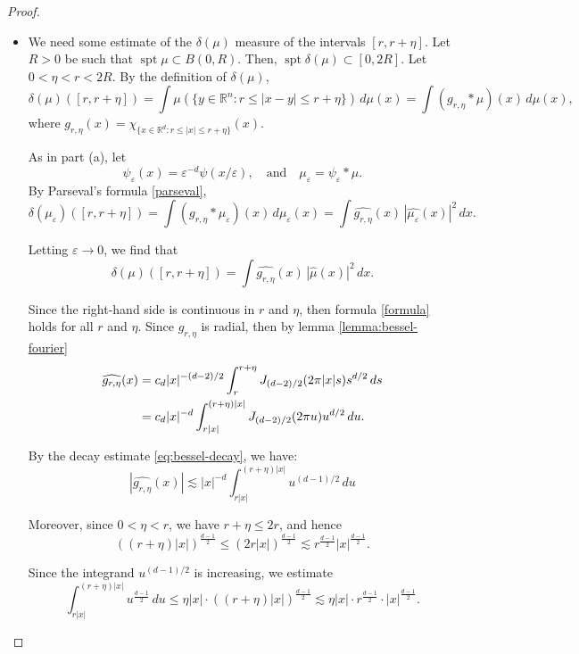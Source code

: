 \documentclass[12pt,a4paper]{report}
\theoremstyle{definition}
\begin{document}
\begin{proof}
\begin{itemize}
\item[(b)] We need some estimate of the \( \delta(\mu) \) measure of the intervals \( [r, r + \eta] \). Let \( R > 0 \) be such that \( \operatorname{spt} \mu \subset B(0, R) \). Then, \( \operatorname{spt} \delta(\mu) \subset [0, 2R] \). Let \( 0 < \eta < r < 2R \). By the definition of \( \delta(\mu) \),
\[
\delta(\mu)([r, r + \eta]) = \int \mu(\{ y \in \mathbb{R}^n : r \leq |x - y| \leq r + \eta \}) \, d\mu(x)
= \int (g_{r,\eta} * \mu)(x) \, d\mu(x),
\]
where \( g_{r,\eta} (x) = \chi_{\{ x \in \mathbb{R}^d : r \leq |x| \leq r + \eta \} } (x) \).

As in part (a), let \[
\psi_\varepsilon(x) = \varepsilon^{-d} \psi(x / \varepsilon), \quad \text{and} \quad \mu_\varepsilon = \psi_\varepsilon * \mu.
\]
By Parseval's formula \ref{parseval},
\[
\delta(\mu_\varepsilon)([r, r + \eta])
= \int (g_{r,\eta} * \mu_\varepsilon)(x) \, d\mu_\varepsilon(x)
= \int \widehat{g_{r,\eta}}(x) \, |\widehat{\mu_\varepsilon}(x)|^2 \, dx.
\]

Letting \( \varepsilon \to 0 \), we find that
\begin{equation}
\delta(\mu)([r, r + \eta]) = \int \widehat{g_{r,\eta}}(x) \, |\widehat{\mu}(x)|^2 \, dx.
\label{formula}
\end{equation}

Since the right-hand side is continuous in \( r \) and \( \eta \), then formula \ref{formula} holds for all \( r \) and \( \eta \). Since \( g_{r,\eta} \) is radial, then by lemma \ref{lemma:bessel-fourier}
\begin{align}
\widehat{g_{r,\eta}}(x) &= c_d |x|^{-(d-2)/2} \int_r^{r+\eta} J_{(d-2)/2}(2\pi |x| s) s^{d/2} \, ds \notag \\
&= c_d  |x|^{-d} \int_{r|x|}^{(r+\eta)|x|} J_{(d-2)/2}(2\pi u) u^{d/2} \, du.
\end{align}

By the decay estimate \eqref{eq:bessel-decay}, we have:
$$ |\widehat{g_{r,\eta}}(x)| \lesssim |x|^{-d} \int_{r|x|}^{(r+\eta)|x|} u^{(d-1)/2} \, du $$

Moreover, since \( 0 < \eta < r \), we have \( r + \eta \le 2r \), and hence
\begin{equation} \label{eq:easy}
((r + \eta)|x|)^{\frac{d-1}{2}} \le (2r |x|)^{\frac{d-1}{2}} \lesssim r^{\frac{d-1}{2}} |x|^{\frac{d-1}{2}}.
\end{equation}

Since the integrand \( u^{(d-1)/2} \) is increasing, we estimate
\begin{equation} \label{eq:gr_eta_estimate_raw}
\int_{r|x|}^{(r + \eta)|x|} u^{\frac{d-1}{2}} \, du
\le \eta |x| \cdot ((r + \eta)|x|)^{\frac{d-1}{2}}
\lesssim \eta |x| \cdot r^{\frac{d-1}{2}} \cdot |x|^{\frac{d-1}{2}}.
\end{equation}


\end{itemize}
\end{proof}
\end{document}
